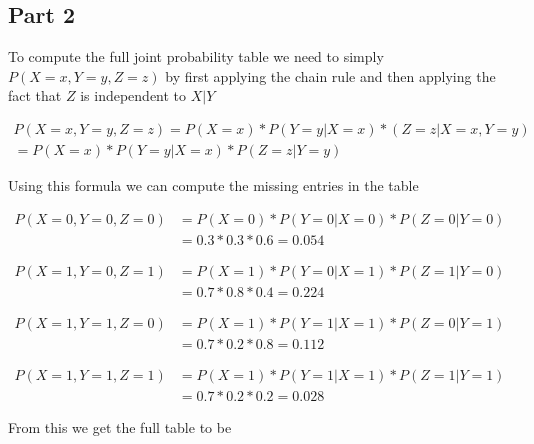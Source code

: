 \documentclass[a4paper, 12pt]{article}
\begin{document}
		\subsection{Part 2}
			To compute the full joint probability table we need to simply $P(X=x,Y=y,Z=z)$ by first applying the chain rule and then applying the fact that $Z$ is independent to $X|Y$
			
			\begin{align*}
				P(X=x,Y=y,Z=z) = P(X=x) * P(Y=y|X=x) * (Z=z|X=x,Y=y)\\
				= P(X=x) * P(Y=y|X=x) * P(Z=z|Y=y)
			\end{align*}
			
			Using this formula we can compute the missing entries in the table			

			\begin{equation*}
				\begin{split}
					P(X=0,Y=0,Z=0) & = P(X=0) * P(Y=0|X=0) * P(Z=0|Y=0) 
					\\					
					& = 0.3 * 0.3 * 0.6 = 0.054
				\end{split}
			\end{equation*}								
					
			\begin{equation*}
				\begin{split}
					P(X=1,Y=0,Z=1) & = P(X=1) * P(Y=0|X=1) * P(Z=1|Y=0)
					\\ 
					& = 0.7 * 0.8 * 0.4 = 0.224
				\end{split}
			\end{equation*}
			
			\begin{equation*}
				\begin{split}
					P(X=1,Y=1,Z=0) & = P(X=1) * P(Y=1|X=1) * P(Z=0|Y=1)
					\\ 
					& = 0.7 * 0.2 * 0.8 = 0.112
				\end{split}
			\end{equation*}
			
			\begin{equation*}
				\begin{split}
					P(X=1,Y=1,Z=1) & = P(X=1) * P(Y=1|X=1) * P(Z=1|Y=1)
					\\
					& = 0.7 * 0.2 * 0.2 = 0.028
				\end{split}
			\end{equation*}						
	
			From this we get the full table to be 	
	
\end{document}
